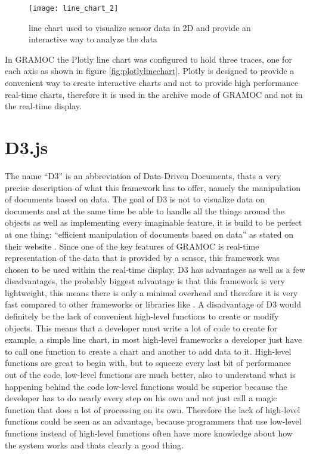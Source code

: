 \begin{figure}[H]
    \centering
    \texttt{[image: line\_chart\_2]}
    \caption{line chart used to visualize sensor data in 2D and provide an interactive way to analyze the data}
    \label{fig:plotlylinechart}
\end{figure}

In GRAMOC the Plotly line chart was configured to hold three traces, one for each axis as shown in figure \vref{fig:plotlylinechart}. Plotly is designed to provide a convenient way to create interactive charts and not to provide high performance real-time charts, therefore it is used in the archive mode of GRAMOC and not in the real-time display.

\section{D3.js}
The name ``D3'' is an abbreviation of Data-Driven Documents, thats a very precise description of what this framework has to offer, namely the manipulation of documents based on data. The goal of D3 is not to visualize data on documents and at the same time be able to handle all the things around the objects as well as implementing every imaginable feature, it is build to be perfect at one thing: ``efficient manipulation of documents based on data'' as stated on their website \autocite{d3}. Since one of the key features of GRAMOC is real-time representation of the data that is provided by a sensor, this framework was chosen to be used within the real-time display. D3 has advantages as well as a few disadvantages, the probably biggest advantage is that this framework is very lightweight, this means there is only a minimal overhead and therefore it is very fast compared to other frameworks or libraries like . A disadvantage of D3 would definitely be the lack of convenient high-level functions to create or modify objects. This means that a developer must write a lot of code to create for example, a simple line chart, in most high-level frameworks a developer just have to call one function to create a chart and another to add data to it. High-level functions are great to begin with, but to squeeze every last bit of performance out of the code, low-level functions are much better, also to understand what is happening behind the code low-level functions would be superior because the developer has to do nearly every step on his own and not just call a magic function that does a lot of processing on its own. Therefore the lack of high-level functions could be seen as an advantage, because programmers that use low-level functions instead of high-level functions often have more knowledge about how the system works and thats clearly a good thing.

